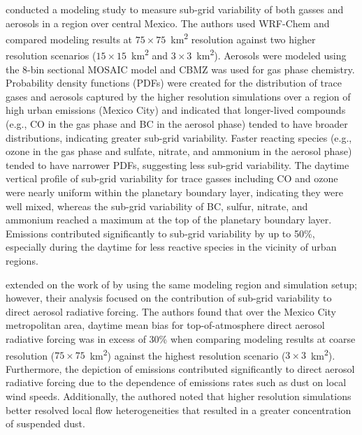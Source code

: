 \textcite{qian_investigation_2010} conducted a modeling study to measure sub-grid variability of both gasses and aerosols in a region over central Mexico. The authors used WRF-Chem and compared modeling results at $75\times75$~\si{km^2} resolution against two higher resolution scenarios ($15\times15$~\si{km^2} and $3\times3$~\si{km^2}). Aerosols were modeled using the 8-bin sectional MOSAIC model and CBMZ was used for gas phase chemistry. Probability density functions (PDFs) were created for the distribution of trace gases and aerosols captured by the higher resolution simulations over a region of high urban emissions (Mexico City) and indicated that longer-lived compounds (e.g., CO in the gas phase and BC in the aerosol phase) tended to have broader distributions, indicating greater sub-grid variability. Faster reacting species (e.g., ozone in the gas phase and sulfate, nitrate, and ammonium in the aerosol phase) tended to have narrower PDFs, suggesting less sub-grid variability. The daytime vertical profile of sub-grid variability for trace gasses including CO and ozone were nearly uniform within the planetary boundary layer, indicating they were well mixed, whereas the sub-grid variability of BC, sulfur, nitrate, and ammonium reached a maximum at the top of the planetary boundary layer. Emissions contributed significantly to sub-grid variability by up to 50\%, especially during the daytime for less reactive species in the vicinity of urban regions. 

\textcite{gustafson_jr_downscaling_2011} extended on the work of \textcite{qian_investigation_2010} by using the same modeling region and simulation setup; however, their analysis focused on the contribution of sub-grid variability to direct aerosol radiative forcing. The authors found that over the Mexico City metropolitan area, daytime mean bias for top-of-atmosphere direct aerosol radiative forcing was in excess of 30\% when comparing modeling results at coarse resolution ($75\times75$~\si{km^2}) against the highest resolution scenario ($3\times3$~\si{km^2}). Furthermore, the depiction of emissions contributed significantly to direct aerosol radiative forcing due to the dependence of emissions rates such as dust on local wind speeds. Additionally, the authored noted that higher resolution simulations better resolved local flow heterogeneities that resulted in a greater concentration of suspended dust. 

